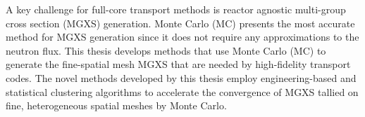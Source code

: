 \begin{abstractpage}

A key challenge for full-core transport methods is reactor agnostic multi-group cross section (MGXS) generation. Monte Carlo (MC) presents the most accurate method for MGXS generation since it does not require any approximations to the neutron flux. This thesis develops methods that use Monte Carlo (MC) to generate the fine-spatial mesh MGXS that are needed by high-fidelity transport codes. The novel methods developed by this thesis employ engineering-based and statistical clustering algorithms to accelerate the convergence of MGXS tallied on fine, heterogeneous spatial meshes by Monte Carlo.







\end{abstractpage}
